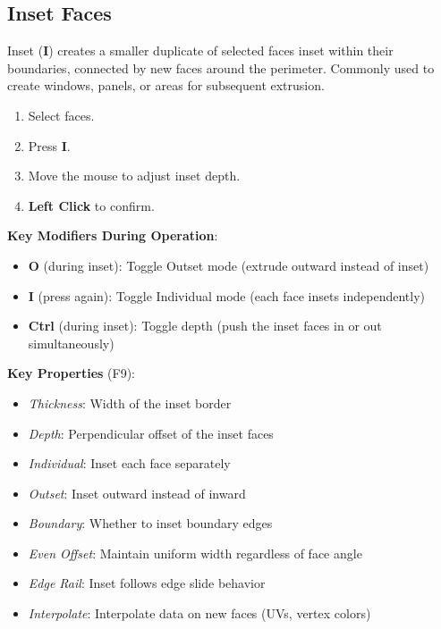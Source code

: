 \subsection{Inset Faces}
\label{sec:inset}

Inset (\textbf{I}) creates a smaller duplicate of selected faces inset within their boundaries, connected by new faces around the perimeter. Commonly used to create windows, panels, or areas for subsequent extrusion.

\begin{enumerate}[leftmargin=2em]
  \item Select faces.
  \item Press \textbf{I}.
  \item Move the mouse to adjust inset depth.
  \item \textbf{Left Click} to confirm.
\end{enumerate}

\textbf{Key Modifiers During Operation}:
\begin{itemize}[leftmargin=2em]
  \item \textbf{O} (during inset): Toggle Outset mode (extrude outward instead of inset)
  \item \textbf{I} (press again): Toggle Individual mode (each face insets independently)
  \item \textbf{Ctrl} (during inset): Toggle depth (push the inset faces in or out simultaneously)
\end{itemize}

\textbf{Key Properties} (F9):
\begin{itemize}[leftmargin=2em]
  \item \textit{Thickness}: Width of the inset border
  \item \textit{Depth}: Perpendicular offset of the inset faces
  \item \textit{Individual}: Inset each face separately
  \item \textit{Outset}: Inset outward instead of inward
  \item \textit{Boundary}: Whether to inset boundary edges
  \item \textit{Even Offset}: Maintain uniform width regardless of face angle
  \item \textit{Edge Rail}: Inset follows edge slide behavior
  \item \textit{Interpolate}: Interpolate data on new faces (UVs, vertex colors)
\end{itemize}

